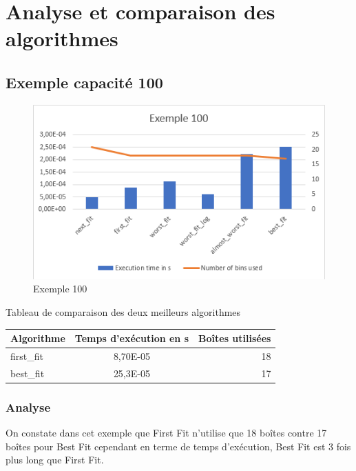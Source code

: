 \documentclass{article}
\begin{document}
\clearpage
\section{Analyse et comparaison des algorithmes}

\subsection{Exemple capacité 100}
\begin{figure}[h]
\begin{center}
\includegraphics{exemple100.png}
\end{center}
\caption{Exemple 100}
\end{figure}

\begin{center}
Tableau de comparaison des deux meilleurs algorithmes
\begin{tabular}{|l|c|r|}
  \hline
  Algorithme & Temps d'exécution en s & Boîtes utilisées \\
  \hline
  first\_fit & 8,70E-05 & 18 \\
  best\_fit & 25,3E-05  & 17 \\
  \hline
\end{tabular}
\end{center}

\subsubsection{Analyse}
On constate dans cet exemple que First Fit n'utilise que 18 boîtes contre 17 boîtes pour Best Fit cependant en terme de temps d'exécution,
Best Fit est 3 fois plus long que First Fit.
\end{document}
